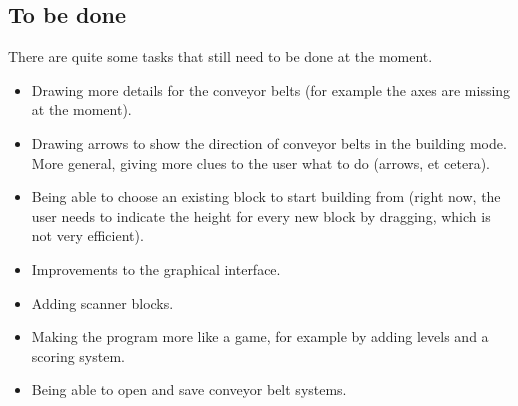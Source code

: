 \subsection{To be done}
There are quite some tasks that still need to be done at the moment.
\begin{itemize}
  \item Drawing more details for the conveyor belts (for example the axes are missing at the moment).
  \item Drawing arrows to show the direction of conveyor belts in the building mode. More general, giving more clues to the user what to do (arrows, et cetera).
  \item Being able to choose an existing block to start building from (right now, the user needs to indicate the height for every new block by dragging, which is not very efficient).
  \item Improvements to the graphical interface.
  \item Adding scanner blocks.
  \item Making the program more like a game, for example by adding levels and a scoring system.
  \item Being able to open and save conveyor belt systems.
\end{itemize}
